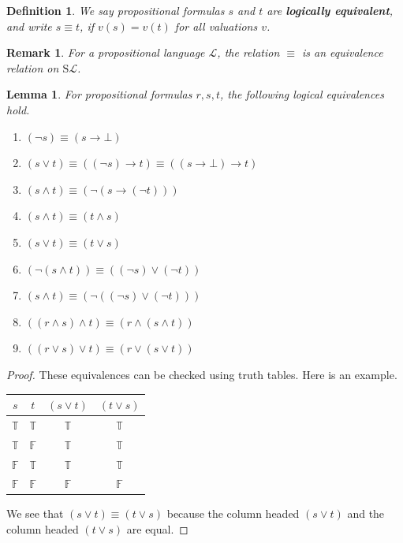 \documentclass[11pt]{article}
\newcommand{\PF}{\mathrm{S}}
\newtheorem{remark}[theorem]{Remark}
\newtheorem{definition}[theorem]{Definition}
\newtheorem{lemma}[theorem]{Lemma}
\newcommand{\mcal}[1]{\mathcal{#1}}
\newcommand{\F}{\mathbb{F}}
\newcommand{\T}{\mathbb{T}}
\begin{document}
\begin{definition}
We say propositional formulas $s$ and $t$ are \textbf{logically equivalent}, and write $s\equiv t$, if $v(s)=v(t)$ for all valuations $v$.
\end{definition}

\begin{remark}
For a propositional language $\mcal{L}$, the relation $\equiv$ is an equivalence relation on $\PF\mcal{L}$.
\end{remark}

\begin{lemma}
For propositional formulas $r,s,t$, the following logical equivalences hold.
\begin{enumerate}
\item $(\neg s)\equiv (s\rightarrow \bot)$
\item $(s\vee t)\equiv ((\neg s)\rightarrow t)\equiv ((s\rightarrow \bot)\rightarrow t)$
\item $(s\wedge t)\equiv (\neg(s\rightarrow (\neg t)))$
\item $(s\wedge t)\equiv (t\wedge s)$
\item $(s\vee t)\equiv (t\vee s)$
\item $(\neg(s\wedge t))\equiv ((\neg s)\vee (\neg t))$
\item $(s\wedge t)\equiv (\neg((\neg s)\vee (\neg t)))$
\item $((r\wedge s)\wedge t)\equiv (r\wedge(s\wedge t))$
\item $((r\vee s)\vee t)\equiv (r\vee(s\vee t))$
\end{enumerate}
\end{lemma}
\begin{proof}
These equivalences can be checked using truth tables. Here is an example.

\medskip

\begin{tabular}{|c|c||c|c|}
  \hline
  $s$ & $t$ & $(s\vee t)$ & $(t\vee s)$ \\ \hline\hline
  $\T$ & $\T$ & $\T$ &  $\T$ \\ \hline
  $\T$ & $\F$ &  $\T$ & $\T$ \\ \hline
  $\F$ &  $\T$ &  $\T$ & $\T$ \\ \hline
  $\F$ & $\F$ & $\F$ & $\F$ \\
  \hline
\end{tabular}

\medskip

We see that $(s\vee t)\equiv (t\vee s)$ because the column headed $(s\vee t)$ and the column headed $(t\vee s)$ are equal.

\end{proof}
\end{document}
